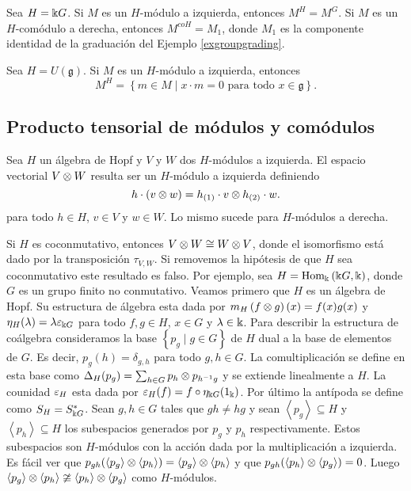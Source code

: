 \documentclass[a4paper,oneside,fleqn,11pt,../tesis.tex]{subfiles}
\begin{document}
\begin{example}
	Sea $H = \Bbbk G$. Si $M$ es un $H$-módulo a izquierda, entonces $M^{H} = M^{G}$. Si $M$ es un $H$-comódulo a derecha, entonces
	$M^{coH} = M_1$, donde $M_1$ es la componente identidad de la graduación del Ejemplo \ref{exgroupgrading}. 
\end{example}

\begin{example}
	Sea $H = U(\mathfrak{g})$. Si $M$ es un $H$-módulo a izquierda, entonces
	\[
		M^{H} = \left\lbrace m \in M \mid x \cdot m = 0 \text{ para todo } x \in \mathfrak{g} \right\rbrace.
	\]
\end{example}

\subsection{Producto tensorial de módulos y comódulos}

Sea $H$ un álgebra de Hopf y $V$ y $W$ dos $H$-módulos a izquierda. El espacio vectorial $V \otimes W$ resulta ser un $H$-módulo a izquierda definiendo
\[
	h \cdot (v \otimes w) = h_{(1)} \cdot v \otimes h_{(2)} \cdot w.	
\]
para todo $h \in H$, $v \in V$ y $w \in W$. Lo mismo sucede para $H$-módulos a derecha.
	
Si $H$ es coconmutativo, entonces $V \otimes W \cong W \otimes V$, donde el isomorfismo está dado por la transposición $\tau_{V, W}$.
Si removemos la hipótesis de que $H$ sea coconmutativo este resultado es falso. Por ejemplo, sea $H = \operatorname{Hom}_{\Bbbk}\left(\Bbbk G, \Bbbk\right)$,
donde $G$ es un grupo finito no conmutativo. Veamos primero que $H$ es un álgebra de Hopf. Su estructura de álgebra esta dada por 
$m_{H}\left(f \otimes g\right)(x) = f(x)g(x)$ y $\eta_{H}(\lambda) = \lambda\varepsilon_{\Bbbk G}$ para todo $f, g \in H$, $x \in G$ y $\lambda \in \Bbbk$.
Para describir la estructura de coálgebra consideramos la base $\left\lbrace p_g \mid g \in G \right\rbrace$ de $H$ dual a la base de elementos de $G$.
Es decir, $p_g(h) = \delta_{g, h}$ para todo $g, h \in G$. La comultiplicación se define en esta base como $\Delta_H(p_g) = \sum_{h \in G} p_h \otimes p_{h^{-1}g}$ y se extiende linealmente a $H$. La counidad $\varepsilon_{H}$ esta dada por $\varepsilon_{H}(f) = f \circ \eta_{\Bbbk G}(1_{\Bbbk})$. Por último la
antípoda se define como $S_{H} = S_{\Bbbk G}^{\ast}$. Sean $g, h \in G$ tales que $gh \neq hg$ y sean
$\left\langle p_g \right\rangle \subseteq H$ y $\left\langle p_h \right\rangle \subseteq H$ los subespacios generados por $p_g$ y $p_h$ respectivamente.
Estos subespacios son $H$-módulos con la acción dada por la multiplicación a izquierda. Es fácil ver que
$p_{gh}(\left\langle p_g \right\rangle \otimes \left\langle p_h \right\rangle) = \left\langle p_g \right\rangle \otimes \left\langle p_h \right\rangle$ y que
$p_{gh}(\left\langle p_h \right\rangle \otimes \left\langle p_g \right\rangle) = 0$. Luego
$\left\langle p_g \right\rangle \otimes \left\langle p_h \right\rangle \ncong \left\langle p_h \right\rangle \otimes \left\langle p_g \right\rangle$
como $H$-módulos.
\end{document}
